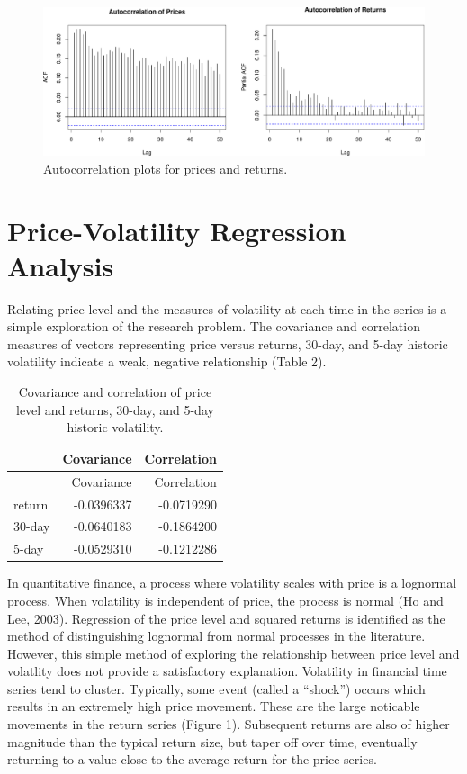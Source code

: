 \documentclass[11pt,]{article}
\begin{document}
\begin{figure}[htbp]
\centering
\includegraphics{Figs/unnamed-chunk-6-1.pdf}
\caption{Autocorrelation plots for prices and returns.}
\end{figure}

\section{Price-Volatility Regression
Analysis}\label{price-volatility-regression-analysis}

Relating price level and the measures of volatility at each time in the
series is a simple exploration of the research problem. The covariance
and correlation measures of vectors representing price versus returns,
30-day, and 5-day historic volatility indicate a weak, negative
relationship (Table 2).

\begin{longtable}[]{@{}lrr@{}}
\caption{Covariance and correlation of price level and returns, 30-day,
and 5-day historic volatility.}\tabularnewline
\toprule
& Covariance & Correlation\tabularnewline
\midrule
\endfirsthead
\toprule
& Covariance & Correlation\tabularnewline
\midrule
\endhead
return & -0.0396337 & -0.0719290\tabularnewline
30-day & -0.0640183 & -0.1864200\tabularnewline
5-day & -0.0529310 & -0.1212286\tabularnewline
\bottomrule
\end{longtable}

In quantitative finance, a process where volatility scales with price is
a lognormal process. When volatility is independent of price, the
process is normal (Ho and Lee, 2003). Regression of the price level and
squared returns is identified as the method of distinguishing lognormal
from normal processes in the literature. However, this simple method of
exploring the relationship between price level and volatlity does not
provide a satisfactory explanation. Volatility in financial time series
tend to cluster. Typically, some event (called a ``shock'') occurs which
results in an extremely high price movement. These are the large
noticable movements in the return series (Figure 1). Subsequent returns
are also of higher magnitude than the typical return size, but taper off
over time, eventually returning to a value close to the average return
for the price series.
\end{document}
